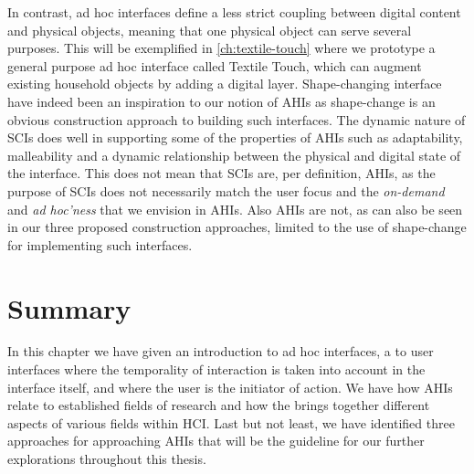 In contrast, ad hoc interfaces define a less strict coupling between digital content and physical objects, meaning that one physical object can serve several purposes.
This will be exemplified in \autoref{ch:textile-touch} where we prototype a general purpose ad hoc interface called Textile Touch, which can augment existing household objects by adding a digital layer. 
\blank
Shape-changing interface have indeed been an inspiration to our notion of AHIs as shape-change is an obvious construction approach to building such interfaces.
The dynamic nature of SCIs does well in supporting some of the properties of AHIs such as adaptability, malleability and a dynamic relationship between the physical and digital state of the interface.
This does not mean that SCIs are, per definition, AHIs, as the purpose of SCIs does not necessarily match the user focus and the \emph{on-demand} and \emph{ad hoc'ness} that we envision in AHIs.
Also AHIs are not, as can also be seen in our three proposed construction approaches, limited to the use of shape-change for implementing such interfaces. 

\section{Summary}

In this chapter we have given an introduction to ad hoc interfaces, a  to user interfaces where the temporality of interaction is taken into account in the interface itself, and where the user is the initiator of action.
We have  how AHIs relate to established fields of research and how the  brings together different aspects of various fields within HCI.
Last but not least, we have identified three approaches for approaching AHIs that will be the guideline for our further explorations throughout this thesis.

